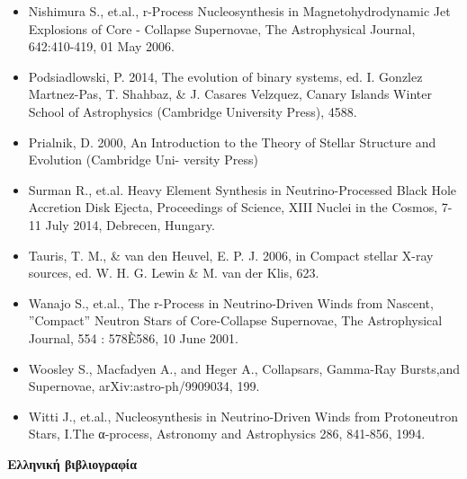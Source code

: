 \begin{itemize}
    \item Nishimura S., et.al., r-Process Nucleosynthesis in Magnetohydrodynamic Jet Explosions of Core - Collapse Supernovae, The Astrophysical Journal, 642:410-419, 01 May 2006.
    
    \item Podsiadlowski, P. 2014, The evolution of binary systems, ed. I. Gonzlez Martnez-Pas, T. Shahbaz, \& J. Casares Velzquez, Canary Islands Winter School of Astrophysics (Cambridge University Press), 4588.
    
    \item Prialnik, D. 2000, An Introduction to the Theory of Stellar Structure and Evolution (Cambridge Uni- versity Press)
    
    \item Surman R., et.al. Heavy Element Synthesis in Neutrino-Processed Black Hole Accretion Disk Ejecta, Proceedings of Science, XIII Nuclei in the Cosmos, 7-11 July 2014, Debrecen, Hungary.
    
    \item Tauris, T. M., \& van den Heuvel, E. P. J. 2006, in Compact stellar X-ray sources, ed. W. H. G. Lewin \& M. van der Klis, 623.
    
    \item Wanajo S., et.al., The r-Process in Neutrino-Driven Winds from Nascent, ”Compact” Neutron Stars of Core-Collapse Supernovae, The Astrophysical Journal, 554 : 578È586, 10 June 2001.
    
    \item Woosley S., Macfadyen A., and Heger A., Collapsars, Gamma-Ray Bursts,and Supernovae, arXiv:astro-ph/9909034, 199.
    
    \item Witti J., et.al., Nucleosynthesis in Neutrino-Driven Winds from Protoneutron Stars, I.The α-process, Astronomy and Astrophysics 286, 841-856, 1994.

\end{itemize}

\textbf{Ελληνική βιβλιογραφία}

